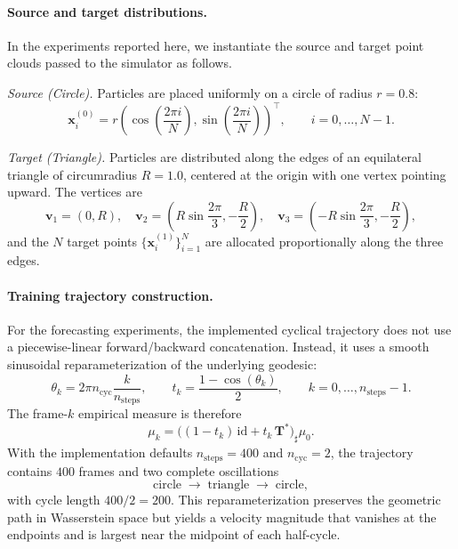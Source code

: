 \documentclass[11pt]{article}
\newcommand{\1}{\mathbf{1}}
\begin{document}
\paragraph{Source and target distributions.}
In the experiments reported here, we instantiate the source and target point clouds passed to the simulator as follows.

\emph{Source (Circle).} Particles are placed uniformly on a circle of radius \(r=0.8\):
\begin{equation}\label{eq:geo-source}
\mathbf{x}_i^{(0)} = r 
\left(\cos\left(\frac{2\pi i}{N}\right), \sin\left(\frac{2\pi i}{N}\right)\right)^\top, 
\qquad i = 0, \ldots, N-1.
\end{equation}

\emph{Target (Triangle).} Particles are distributed along the edges of an equilateral triangle of circumradius \(R=1.0\), centered at the origin with one vertex pointing upward. The vertices are
\begin{equation}\label{eq:triangle-vertices}
\mathbf{v}_1 = (0, R), \quad 
\mathbf{v}_2 = \left(R\sin\frac{2\pi}{3}, -\frac{R}{2}\right), \quad 
\mathbf{v}_3 = \left(-R\sin\frac{2\pi}{3}, -\frac{R}{2}\right),
\end{equation}
and the \(N\) target points \(\{\mathbf{x}_i^{(1)}\}_{i=1}^N\) are allocated proportionally along the three edges.

\paragraph{Training trajectory construction.}
For the forecasting experiments, the implemented cyclical trajectory does not use a piecewise-linear forward/backward concatenation. Instead, it uses a smooth sinusoidal reparameterization of the underlying geodesic:
\[
\theta_k = 2\pi n_{\mathrm{cyc}} \frac{k}{n_{\mathrm{steps}}},
\qquad
t_k = \frac{1-\cos(\theta_k)}{2},
\qquad
k=0,\dots,n_{\mathrm{steps}}-1.
\]
The frame-\(k\) empirical measure is therefore
\begin{equation}\label{eq:geo-pingpong}
\mu_k = \big((1-t_k)\,\mathrm{id}+t_k\,\mathbf{T}^*\big)_\sharp \mu_0.
\end{equation}
With the implementation defaults \(n_{\mathrm{steps}}=400\) and \(n_{\mathrm{cyc}}=2\), the trajectory contains \(400\) frames and two complete oscillations
\[
\text{circle} \;\to\; \text{triangle} \;\to\; \text{circle},
\]
with cycle length \(400/2=200\). This reparameterization preserves the geometric path in Wasserstein space but yields a velocity magnitude that vanishes at the endpoints and is largest near the midpoint of each half-cycle.
\end{document}
